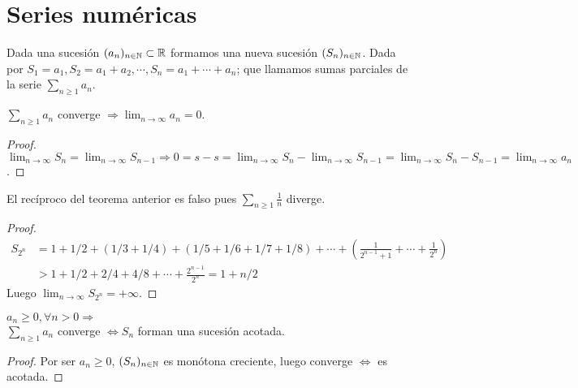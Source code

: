 \section{Series numéricas}

Dada una sucesión $(a_n)_{n \in \mathbb{N}} \subset \mathbb{R}$ formamos una nueva sucesión $(S_n)_{n \in \mathbb{N}}$. Dada por $S_1 = a_1, S_2 = a_1 + a_2, \cdots, S_n = a_1 + \cdots + a_n$; que llamamos sumas parciales de la serie $\sum_{n \geq 1} a_n$.


\begin{theorem}
  $\sum_{n \geq 1} a_n$ converge $\Rightarrow \lim_{n \to \infty} a_n = 0$.
  \begin{proof}
    $\lim_{n \to \infty} S_n = \lim_{n \to \infty} S_{n-1} \Rightarrow 0 = s - s = \lim_{n \to \infty} S_n - \lim_{n \to \infty} S_{n-1} = \lim_{n \to \infty} S_n - S_{n-1} = \lim_{n \to \infty} a_n$.
  \end{proof}
\end{theorem}

\clearpage

\begin{eg}
  El recíproco del teorema anterior es falso pues $\sum_{n \geq 1} \frac{1}{n}$ diverge.
  \begin{proof}
    \begin{align*}
      S_{2^n} & = 1 + 1/2 + (1/3 + 1/4) + (1/5 + 1/6 + 1/7 + 1/8) + \cdots + (\frac{1}{2^{n-1}+1} + \cdots + \frac{1}{2^n}) \\
              & > 1 + 1/2 + 2/4 + 4/8 + \cdots + \frac{2^{n-1}}{2^n} = 1 + n/2
    \end{align*}
    Luego $\lim_{n \to \infty} S_{2^n} = + \infty$.
  \end{proof}
\end{eg}

\begin{theorem}
  $a_n \geq 0, \forall n > 0 \Rightarrow$ \\
  $\sum_{n \geq 1} a_n$ converge $\iff S_n$ forman una sucesión acotada.
  \begin{proof}
    Por ser $a_n \geq 0$, $(S_n)_{n \in \mathbb{N}}$ es monótona creciente, luego converge $\iff$ es acotada.
  \end{proof}
\end{theorem}

